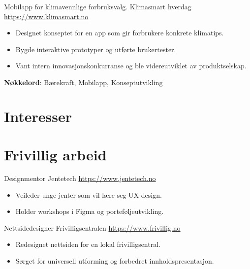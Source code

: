 \documentclass[a4paper, serif, 10pt]{moderncv}
\begin{document}
        {Mobilapp for klimavennlige forbruksvalg.}
        {Klimasmart hverdag}
        {\url{https://www.klimasmart.no}}
        {}
        {\begin{itemize}
\item Designet konseptet for en app som gir forbrukere konkrete klimatips.
\item Bygde interaktive prototyper og utførte brukertester.
\item Vant intern innovasjonskonkurranse og ble videreutviklet av produktselskap.
\end{itemize}
\textbf{Nøkkelord}: Bærekraft, Mobilapp, Konseptutvikling}
\section{Interesser}

\section{Frivillig arbeid}

        {Designmentor}
        {Jentetech}
        {\url{https://www.jentetech.no}}
        {}
        {\begin{itemize}
\item Veileder unge jenter som vil lære seg UX-design.
\item Holder workshops i Figma og porteføljeutvikling.
\end{itemize}}


        {Nettsidedesigner}
        {Frivilligsentralen}
        {\url{https://www.frivillig.no}}
        {}
        {\begin{itemize}
\item Redesignet nettsiden for en lokal frivilligsentral.
\item Sørget for universell utforming og forbedret innholdspresentasjon.
\end{itemize}}
\end{document}
